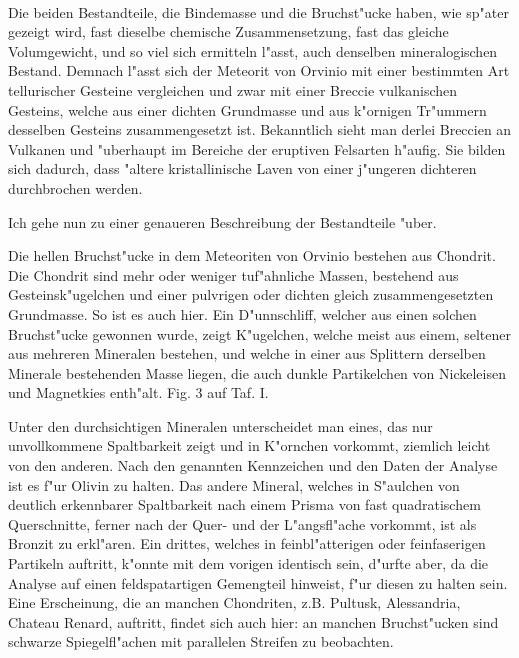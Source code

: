 \documentclass[a4paper, 11pt, oneside]{article}
\begin{document}
\paragraph{}
Die beiden Bestandteile, die Bindemasse und die Bruchst"ucke haben, wie sp"ater gezeigt wird, fast dieselbe chemische Zusammensetzung, fast das gleiche Volumgewicht, und so viel sich ermitteln l"asst, auch denselben mineralogischen Bestand. Demnach l"asst sich der Meteorit von Orvinio mit einer bestimmten Art tellurischer Gesteine vergleichen und zwar mit einer Breccie vulkanischen Gesteins, welche aus einer dichten Grundmasse und aus k"ornigen Tr"ummern desselben Gesteins zusammengesetzt ist. Bekanntlich sieht man derlei Breccien an Vulkanen und "uberhaupt im Bereiche der eruptiven Felsarten h"aufig. Sie bilden sich dadurch, dass "altere kristallinische Laven von einer j"ungeren dichteren durchbrochen werden.

Ich gehe nun zu einer genaueren Beschreibung der Bestandteile "uber.

Die hellen Bruchst"ucke in dem Meteoriten von Orvinio bestehen aus Chondrit. Die Chondrit sind mehr oder weniger tuf"ahnliche Massen, bestehend aus Gesteinsk"ugelchen und einer pulvrigen oder dichten gleich zusammengesetzten Grundmasse. So ist es auch hier. Ein D"unnschliff, welcher aus einen solchen Bruchst"ucke gewonnen wurde, zeigt K"ugelchen, welche meist aus einem, seltener aus mehreren Mineralen bestehen, und welche in einer aus Splittern derselben Minerale bestehenden Masse liegen, die auch dunkle Partikelchen von Nickeleisen und Magnetkies enth"alt. Fig. 3 auf Taf. I.

Unter den durchsichtigen Mineralen unterscheidet man eines, das nur unvollkommene Spaltbarkeit zeigt und in K"ornchen vorkommt, ziemlich leicht von den anderen. Nach den genannten Kennzeichen und den Daten der Analyse ist es f"ur Olivin zu halten. Das andere Mineral, welches in S"aulchen von deutlich erkennbarer Spaltbarkeit nach einem Prisma von fast quadratischem Querschnitte, ferner nach der Quer- und der L"angsfl"ache vorkommt, ist als Bronzit zu erkl"aren. Ein drittes, welches in feinbl"atterigen oder feinfaserigen Partikeln auftritt, k"onnte mit dem vorigen identisch sein, d"urfte aber, da die Analyse auf einen feldspatartigen Gemengteil hinweist, f"ur diesen zu halten sein. Eine Erscheinung, die an manchen Chondriten, z.B. Pultusk, Alessandria, Chateau Renard, auftritt, findet sich auch hier: an manchen Bruchst"ucken sind schwarze Spiegelfl"achen mit parallelen Streifen zu beobachten.
\end{document}

